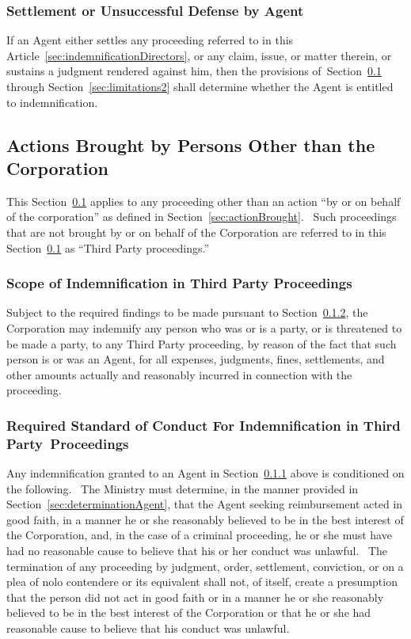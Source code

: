 \documentclass[letterpaper,titlepage]{article}
\begin{document}
\subsubsection{Settlement or Unsuccessful Defense by Agent}
\label{sec:settlement}
If an Agent either settles any proceeding referred to in this
Article~\ref{sec:indemnificationDirectors}, or any claim, issue, or matter therein, or
sustains a judgment rendered against him, then the provisions
of Section~\ref{sec:actionsBrought} through Section~\ref{sec:limitations2} shall determine whether the Agent is entitled to indemnification.
\subsection{Actions Brought by Persons Other than the Corporation}
\label{sec:actionsBrought}
This Section~\ref{sec:actionsBrought} applies to any proceeding other than an
action ``by or on behalf of the corporation'' as defined in
Section~\ref{sec:actionBrought}.  Such proceedings that are not brought by or
on behalf of the Corporation are referred to in this
Section~\ref{sec:actionsBrought} as ``Third Party proceedings.''
\subsubsection{Scope of Indemnification in Third Party Proceedings}
\label{sec:scopeIndemnificationThird}
Subject to the required findings to be made pursuant to
Section~\ref{sec:requiredStandard}, the Corporation may indemnify any person who was or is a party, or is threatened to be made a party, to any Third Party proceeding, by reason of the fact that such person is or was an Agent, for all expenses, judgments, fines, settlements, and other amounts actually and reasonably incurred in connection with the proceeding. 
\subsubsection{Required Standard of Conduct For Indemnification in Third Party Proceedings}
\label{sec:requiredStandard}
Any indemnification granted to an Agent in
Section~\ref{sec:scopeIndemnificationThird} above is conditioned on the following. 
The Ministry must determine, in the manner provided in
Section~\ref{sec:determinationAgent}, that the Agent seeking reimbursement acted in good faith, in a manner he or she reasonably believed to be in the best interest of the Corporation, and, in the case of a criminal proceeding, he or she must have had no reasonable cause to believe that his or her conduct was unlawful.  The termination of any proceeding by judgment, order, settlement, conviction, or on a plea of nolo contendere or its equivalent shall not, of itself, create a presumption that the person did not act in good faith or in a manner he or she reasonably believed to be in the best interest of the Corporation or that he or she had reasonable cause to believe that his conduct was unlawful.
\end{document}

